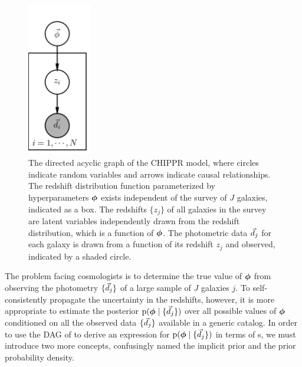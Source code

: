 \begin{figure}
	\begin{center}
		\includegraphics[width=0.25\textwidth]{figures/chippr/pgm.png}
		\caption{The directed acyclic graph of the CHIPPR model, where circles indicate random variables and arrows indicate causal relationships.
			The redshift distribution function parameterized by hyperparameters ${\boldsymbol{\phi}}$ exists independent of the survey of $J$ galaxies, indicated as a box.  
			The redshifts $\{z_{j}\}$ of all galaxies in the survey are latent variables independently drawn from the redshift distribution, which is a function of ${\boldsymbol{\phi}}$. 
			The photometric data $\vec{d}_{j}$ for each galaxy is drawn from a function of its redshift $z_{j}$ and observed, indicated by a shaded circle.}
	\end{center}
\end{figure}

The problem facing cosmologists is to determine the true value of ${\boldsymbol{\phi}}$ from observing the photometry $\{\vec{d}_{j}\}$ of a large sample of $J$ galaxies $j$.
To self-consistently propagate the uncertainty in the redshifts, however, it is more appropriate to estimate the posterior $\mathrm{p}({\boldsymbol{\phi}} \mid \{\vec{d}_{j}\})$ over all possible values of ${\boldsymbol{\phi}}$ conditioned on all the observed data $\{\vec{d}_{j}\}$ available in a generic catalog.
In order to use the DAG of  to derive an expression for $\mathrm{p}({\boldsymbol{\phi}} \mid \{\vec{d}_{j}\})$ in terms of \pzpdf s, we must introduce two more concepts, confusingly named the implicit prior and the prior probability density.

